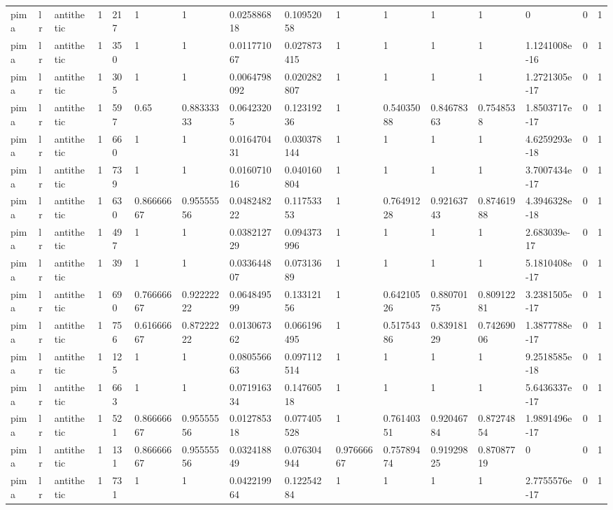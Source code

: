 \begin{tabular}{llllllllllllllll}
pima & lr & antithetic & 1 & 217 & 1 & 1 & 0.025886818 & 0.10952058 & 1 & 1 & 1 & 1 & 0 & 0 & 1 \\
pima & lr & antithetic & 1 & 350 & 1 & 1 & 0.011771067 & 0.027873415 & 1 & 1 & 1 & 1 & 1.1241008e-16 & 0 & 1 \\
pima & lr & antithetic & 1 & 305 & 1 & 1 & 0.0064798092 & 0.020282807 & 1 & 1 & 1 & 1 & 1.2721305e-17 & 0 & 1 \\
pima & lr & antithetic & 1 & 597 & 0.65 & 0.88333333 & 0.06423205 & 0.12319236 & 1 & 0.54035088 & 0.84678363 & 0.7548538 & 1.8503717e-17 & 0 & 1 \\
pima & lr & antithetic & 1 & 660 & 1 & 1 & 0.016470431 & 0.030378144 & 1 & 1 & 1 & 1 & 4.6259293e-18 & 0 & 1 \\
pima & lr & antithetic & 1 & 739 & 1 & 1 & 0.016071016 & 0.040160804 & 1 & 1 & 1 & 1 & 3.7007434e-17 & 0 & 1 \\
pima & lr & antithetic & 1 & 630 & 0.86666667 & 0.95555556 & 0.048248222 & 0.11753353 & 1 & 0.76491228 & 0.92163743 & 0.87461988 & 4.3946328e-18 & 0 & 1 \\
pima & lr & antithetic & 1 & 497 & 1 & 1 & 0.038212729 & 0.094373996 & 1 & 1 & 1 & 1 & 2.683039e-17 & 0 & 1 \\
pima & lr & antithetic & 1 & 39 & 1 & 1 & 0.033644807 & 0.07313689 & 1 & 1 & 1 & 1 & 5.1810408e-17 & 0 & 1 \\
pima & lr & antithetic & 1 & 690 & 0.76666667 & 0.92222222 & 0.064849599 & 0.13312156 & 1 & 0.64210526 & 0.88070175 & 0.80912281 & 3.2381505e-17 & 0 & 1 \\
pima & lr & antithetic & 1 & 756 & 0.61666667 & 0.87222222 & 0.013067362 & 0.066196495 & 1 & 0.51754386 & 0.83918129 & 0.74269006 & 1.3877788e-17 & 0 & 1 \\
pima & lr & antithetic & 1 & 125 & 1 & 1 & 0.080556663 & 0.097112514 & 1 & 1 & 1 & 1 & 9.2518585e-18 & 0 & 1 \\
pima & lr & antithetic & 1 & 663 & 1 & 1 & 0.071916334 & 0.14760518 & 1 & 1 & 1 & 1 & 5.6436337e-17 & 0 & 1 \\
pima & lr & antithetic & 1 & 521 & 0.86666667 & 0.95555556 & 0.012785318 & 0.077405528 & 1 & 0.76140351 & 0.92046784 & 0.87274854 & 1.9891496e-17 & 0 & 1 \\
pima & lr & antithetic & 1 & 131 & 0.86666667 & 0.95555556 & 0.032418849 & 0.076304944 & 0.97666667 & 0.75789474 & 0.91929825 & 0.87087719 & 0 & 0 & 1 \\
pima & lr & antithetic & 1 & 731 & 1 & 1 & 0.042219964 & 0.12254284 & 1 & 1 & 1 & 1 & 2.7755576e-17 & 0 & 1 \\

\end{tabular}
